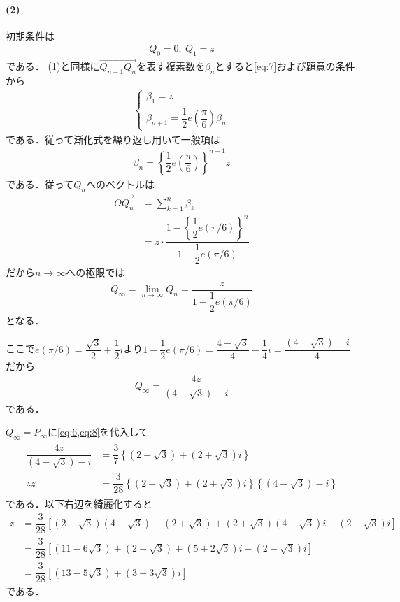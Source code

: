 \documentclass[../../main.tex]{subfiles}
\begin{document}
\paragraph{(2)}

初期条件は
\begin{align}
  Q_0=0,\ Q_1=z \label{eq:7}
\end{align}
である．
(1)と同様に$\overrightarrow{Q_{n-1}Q_n}$を表す複素数を$\beta_n$とすると\cref{eq:7}および題意の条件から
\begin{align}
  \begin{cases}
    \beta_1=z \\
    \beta_{n+1}=\dfrac{1}{2}e\left(\dfrac{\pi}{6}\right)\beta_n
  \end{cases}
\end{align}
である．従って漸化式を繰り返し用いて一般項は
\begin{align}
  \beta_n=\left\{\dfrac{1}{2}e\left(\dfrac{\pi}{6}\right)\right\}^{n-1}z
\end{align}
である．従って$Q_n$へのベクトルは
\begin{align}
  \overrightarrow{OQ_n}
  &=\sum_{k=1}^n\beta_k \\
  &=z\cdot\dfrac{1-\left\{\dfrac{1}{2}e(\pi/6)\right\}^n}{1-\dfrac{1}{2}e(\pi/6)}
\end{align}
だから$n\to\infty$への極限では
\begin{align}
  Q_{\infty} = \lim_{n\to\infty}Q_{n} = \dfrac{z}{1-\dfrac{1}{2}e(\pi/6)}
\end{align}
となる．

ここで$e(\pi/6)=\dfrac{\sqrt{3}}{2}+\dfrac{1}{2}i$より$1-\dfrac{1}{2}e(\pi/6)=\dfrac{4-\sqrt{3}}{4}-\dfrac{1}{4}i=\dfrac{(4-\sqrt{3})-i}{4}$だから
\begin{align}
  Q_\infty=\dfrac{4z}{(4-\sqrt{3})-i} \label{eq:8}
\end{align}
である．

$Q_\infty=P_\infty$に\cref{eq:6,eq:8}を代入して
\begin{align}
  \begin{split}
    \dfrac{4z}{(4-\sqrt{3})-i}&=\dfrac{3}{7}\left\{(2-\sqrt{3})+(2+\sqrt{3})i\right\} \\
    \therefore
    z&=\dfrac{3}{28}\left\{(2-\sqrt{3})+(2+\sqrt{3})i\right\}\left\{(4-\sqrt{3})-i\right\}
  \end{split}
\end{align}
である．以下右辺を綺麗化すると
\begin{align}
  z
  &= \dfrac{3}{28} \left[(2-\sqrt{3})(4-\sqrt{3})+(2+\sqrt{3}) + (2+\sqrt{3})(4-\sqrt{3})i -(2-\sqrt{3})i\right] \\
  &= \dfrac{3}{28} \left[(11-6\sqrt{3})+(2+\sqrt{3}) + (5+2\sqrt{3})i -(2-\sqrt{3})i\right] \\
  &= \dfrac{3}{28} \left[(13-5\sqrt{3}) + (3+3\sqrt{3})i \right]
\end{align}
である．
\end{document}
